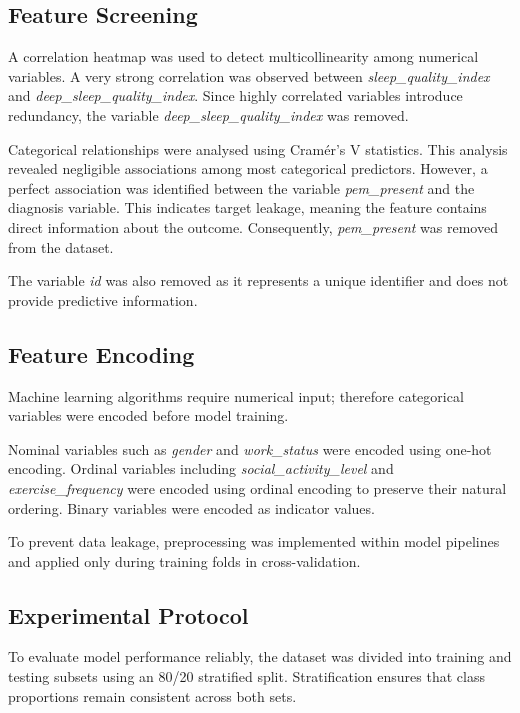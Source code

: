 \documentclass[11pt]{article}
\begin{document}
\subsection{Feature Screening}

A correlation heatmap was used to detect multicollinearity among numerical variables. A very strong correlation was observed between \textit{sleep\_quality\_index} and \textit{deep\_sleep\_quality\_index}. Since highly correlated variables introduce redundancy, the variable \textit{deep\_sleep\_quality\_index} was removed.

Categorical relationships were analysed using Cramér’s V statistics. This analysis revealed negligible associations among most categorical predictors. However, a perfect association was identified between the variable \textit{pem\_present} and the diagnosis variable. This indicates target leakage, meaning the feature contains direct information about the outcome. Consequently, \textit{pem\_present} was removed from the dataset.

The variable \textit{id} was also removed as it represents a unique identifier and does not provide predictive information.

\subsection{Feature Encoding}

Machine learning algorithms require numerical input; therefore categorical variables were encoded before model training.

Nominal variables such as \textit{gender} and \textit{work\_status} were encoded using one-hot encoding. Ordinal variables including \textit{social\_activity\_level} and \textit{exercise\_frequency} were encoded using ordinal encoding to preserve their natural ordering. Binary variables were encoded as indicator values.

To prevent data leakage, preprocessing was implemented within model pipelines and applied only during training folds in cross-validation.

\subsection{Experimental Protocol}

To evaluate model performance reliably, the dataset was divided into training and testing subsets using an 80/20 stratified split. Stratification ensures that class proportions remain consistent across both sets.
\end{document}
